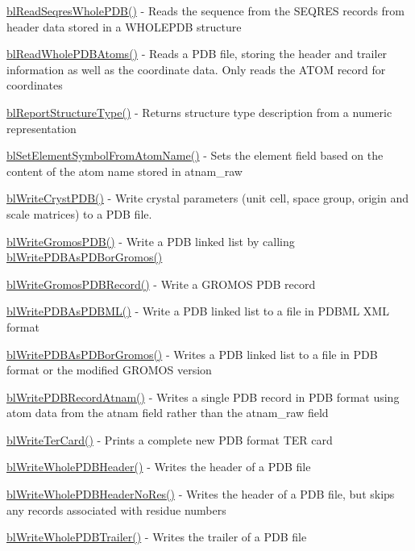 \begin{DoxyItemize}
\item \hyperlink{pdb_8h_a05140d6cdf11bff4e029ec0e9b307e0d}{bl\-Read\-Seqres\-Whole\-P\-D\-B()} -\/ Reads the sequence from the S\-E\-Q\-R\-E\-S records from header data stored in a W\-H\-O\-L\-E\-P\-D\-B structure
\item \hyperlink{pdb_8h_a56ce69a8cb41874090869c11246e0b0e}{bl\-Read\-Whole\-P\-D\-B\-Atoms()} -\/ Reads a P\-D\-B file, storing the header and trailer information as well as the coordinate data. Only reads the A\-T\-O\-M record for coordinates
\item \hyperlink{pdb_8h_a5675f476756f02a9ccdca4143dc3f8bc}{bl\-Report\-Structure\-Type()} -\/ Returns structure type description from a numeric representation
\item \hyperlink{pdb_8h_ad1ac8c9e80a90772fadb3db213dcb091}{bl\-Set\-Element\-Symbol\-From\-Atom\-Name()} -\/ Sets the element field based on the content of the atom name stored in atnam\-\_\-raw
\item \hyperlink{pdb_8h_ac7cfad642d8a9287de0b7d46eb1105c7}{bl\-Write\-Cryst\-P\-D\-B()} -\/ Write crystal parameters (unit cell, space group, origin and scale matrices) to a P\-D\-B file.
\item \hyperlink{pdb_8h_ab9293b4f3ac5e09a01ba3efe31c88561}{bl\-Write\-Gromos\-P\-D\-B()} -\/ Write a P\-D\-B linked list by calling \hyperlink{pdb_8h_a9dfc0bf16ae99ffe8d06f85f0570c214}{bl\-Write\-P\-D\-B\-As\-P\-D\-Bor\-Gromos()}
\item \hyperlink{pdb_8h_aed0b487e0e0e60cdcd54fb5efe3d605b}{bl\-Write\-Gromos\-P\-D\-B\-Record()} -\/ Write a G\-R\-O\-M\-O\-S P\-D\-B record
\item \hyperlink{pdb_8h_a61af7bbe63cb7d61c90190dc64365200}{bl\-Write\-P\-D\-B\-As\-P\-D\-B\-M\-L()} -\/ Write a P\-D\-B linked list to a file in P\-D\-B\-M\-L X\-M\-L format
\item \hyperlink{pdb_8h_a9dfc0bf16ae99ffe8d06f85f0570c214}{bl\-Write\-P\-D\-B\-As\-P\-D\-Bor\-Gromos()} -\/ Writes a P\-D\-B linked list to a file in P\-D\-B format or the modified G\-R\-O\-M\-O\-S version
\item \hyperlink{pdb_8h_aea39909935b5431a822bfc8109827aa3}{bl\-Write\-P\-D\-B\-Record\-Atnam()} -\/ Writes a single P\-D\-B record in P\-D\-B format using atom data from the atnam field rather than the atnam\-\_\-raw field
\item \hyperlink{pdb_8h_a38074f8c79f2c5580917416cb2acdd8e}{bl\-Write\-Ter\-Card()} -\/ Prints a complete new P\-D\-B format T\-E\-R card
\item \hyperlink{pdb_8h_ad26e70b41f8f5de74c3943a903087294}{bl\-Write\-Whole\-P\-D\-B\-Header()} -\/ Writes the header of a P\-D\-B file
\item \hyperlink{pdb_8h_aa27fe4cbc1362b181b308c8f1eeff85d}{bl\-Write\-Whole\-P\-D\-B\-Header\-No\-Res()} -\/ Writes the header of a P\-D\-B file, but skips any records associated with residue numbers
\item \hyperlink{pdb_8h_a0fba06c6fec28f13118fd7900f1cf01f}{bl\-Write\-Whole\-P\-D\-B\-Trailer()} -\/ Writes the trailer of a P\-D\-B file
\end{DoxyItemize}

